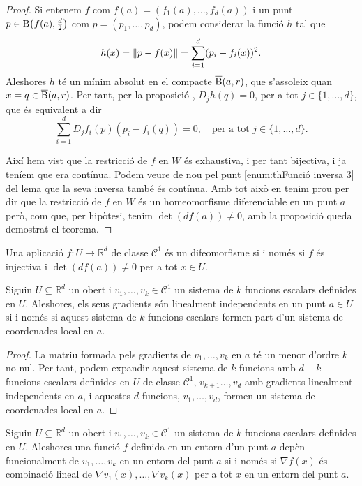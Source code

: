 \documentclass[../Apunts.tex]{subfiles}
\begin{document}
\begin{theorem}
\begin{proof}
			Si entenem \(f\) com \(f(a)=(f_{1}(a),\dots,f_{d}(a))\) i un punt \(p\in\B\left(f(a),\tfrac{d}{2}\right)\) com \(p=(p_{1},\dots,p_{d})\), podem considerar la funció \(h\) tal que
			\[h(x)=\norm{p-f(x)}=\sum_{i=1}^{d}(p_{i}-f_{i}(x))^{2}.\]
			Aleshores \(h\) té un mínim absolut en el compacte \(\overline{\operatorname{B}}(a,r)\), que s'assoleix quan \(x=q\in\overline{\operatorname{B}}(a,r)\). Per tant, per la proposició , \(D_{j}h(q)=0\), per a tot \(j\in\{1,\dots,d\}\), que és equivalent a dir
			\[\sum_{i=1}^{d}D_{j}f_{i}(p)(p_{i}-f_{i}(q))=0,\quad\text{per a tot }j\in\{1,\dots,d\}.\]
			
			Així hem vist que la restricció de \(f\) en \(W\) és exhaustiva, i per tant bijectiva, i ja teníem que era contínua. Podem veure de nou pel punt \eqref{enum:thFunció inversa 3} del lema  que la seva inversa també és contínua. Amb tot això en tenim prou per dir que la restricció de \(f\) en \(W\) és un homeomorfisme diferenciable en un punt \(a\) però, com que, per hipòtesi, tenim \(\det(df(a))\neq0\), amb la proposició  queda demostrat el teorema.
		\end{proof}
	\end{theorem}
	\begin{corollary} %
		Una aplicació \(f\colon U\to \mathbb{R}^{d}\) de classe \(\mathcal{C}^{1}\) és un difeomorfisme si i només si \(f\) és injectiva i \(\det(df(a))\neq0\) per a tot \(x\in U\).
	\end{corollary}
	\begin{proposition}
		Siguin \(U\subseteq\mathbb{R}^{d}\) un obert i \(v_{1},\dots,v_{k}\in\mathcal{C}^{1}\) un sistema de \(k\) funcions escalars definides en \(U\). Aleshores, els seus gradients són linealment independents en un punt \(a\in U\) si i només si aquest sistema de \(k\) funcions escalars formen part d'un sistema de coordenades local en \(a\).
		\begin{proof}
			La matriu formada pels gradients de \(v_{1},\dots,v_{k}\) en \(a\) té un menor d'ordre \(k\) no nul. Per tant, podem expandir aquest sistema de \(k\) funcions amb \(d-k\) funcions escalars definides en \(U\) de classe \(\mathcal{C}^{1}\), \(v_{k+1}\dots,v_{d}\) amb gradients linealment independents en \(a\), i aquestes \(d\) funcions, \(v_{1},\dots,v_{d}\), formen un sistema de coordenades local en \(a\).
		\end{proof}
	\end{proposition}
	\begin{corollary}\label{corollary:dependència funcional iff dependència lineal dels gradients}
		Siguin \(U\subseteq\mathbb{R}^{d}\) un obert i \(v_{1},\dots,v_{k}\in\mathcal{C}^{1}\) un sistema de \(k\) funcions escalars definides en \(U\). Aleshores una funció \(f\) definida en un entorn d'un punt \(a\) depèn funcionalment de \(v_{1},\dots,v_{k}\) en un entorn del punt \(a\) si i només si \(\nabla f(x)\) és combinació lineal de \(\nabla v_{1}(x),\dots,\nabla v_{k}(x)\) per a tot \(x\) en un entorn del punt \(a\).
	\end{corollary}
\end{document}
